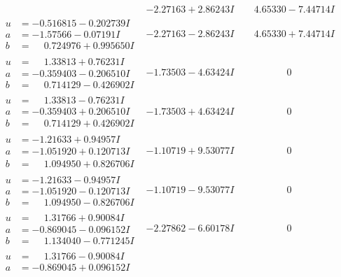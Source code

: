 \documentclass[1p]{elsarticle_modified}
\theoremstyle{definition}
\begin{document}
$$\begin{array}{c|c|c}
 & -2.27163 + 2.86243 I & \phantom{-}4.65330 - 7.44714 I \\ \hline\begin{aligned}
u &= -0.516815 - 0.202739 I \\
a &= -1.57566 - 0.07191 I \\
b &= \phantom{-}0.724976 + 0.995650 I\end{aligned}
 & -2.27163 - 2.86243 I & \phantom{-}4.65330 + 7.44714 I \\ \hline\begin{aligned}
u &= \phantom{-}1.33813 + 0.76231 I \\
a &= -0.359403 - 0.206510 I \\
b &= \phantom{-}0.714129 - 0.426902 I\end{aligned}
 & -1.73503 - 4.63424 I & \phantom{-0.000000 } 0 \\ \hline\begin{aligned}
u &= \phantom{-}1.33813 - 0.76231 I \\
a &= -0.359403 + 0.206510 I \\
b &= \phantom{-}0.714129 + 0.426902 I\end{aligned}
 & -1.73503 + 4.63424 I & \phantom{-0.000000 } 0 \\ \hline\begin{aligned}
u &= -1.21633 + 0.94957 I \\
a &= -1.051920 + 0.120713 I \\
b &= \phantom{-}1.094950 + 0.826706 I\end{aligned}
 & -1.10719 + 9.53077 I & \phantom{-0.000000 } 0 \\ \hline\begin{aligned}
u &= -1.21633 - 0.94957 I \\
a &= -1.051920 - 0.120713 I \\
b &= \phantom{-}1.094950 - 0.826706 I\end{aligned}
 & -1.10719 - 9.53077 I & \phantom{-0.000000 } 0 \\ \hline\begin{aligned}
u &= \phantom{-}1.31766 + 0.90084 I \\
a &= -0.869045 - 0.096152 I \\
b &= \phantom{-}1.134040 - 0.771245 I\end{aligned}
 & -2.27862 - 6.60178 I & \phantom{-0.000000 } 0 \\ \hline\begin{aligned}
u &= \phantom{-}1.31766 - 0.90084 I \\
a &= -0.869045 + 0.096152 I \\

\end{aligned}
\end{array}$$
\end{document}
